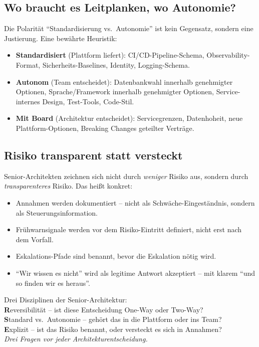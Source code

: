 \documentclass[11pt,a4paper,oneside]{article}
\newcommand{\caveatfontfallback}{\itshape}
\newcommand\caveatfont{\caveatfontfallback}%
\newcommand{\akzent}[1]{{\caveatfont\color{lpAmber}#1}}
\begin{document}
\subsection{Wo braucht es Leitplanken, wo Autonomie?}

Die Polarität ``Standardisierung vs.\ Autonomie'' ist kein Gegensatz, sondern eine Justierung. Eine bewährte Heuristik:

\begin{itemize}
  \item \textbf{Standardisiert} (Plattform liefert): CI/CD-Pipeline-Schema, Observability-Format, Sicherheits-Baselines, Identity, Logging-Schema.
  \item \textbf{Autonom} (Team entscheidet): Datenbankwahl innerhalb genehmigter Optionen, Sprache/Framework innerhalb genehmigter Optionen, Service-internes Design, Test-Tools, Code-Stil.
  \item \textbf{Mit Board} (Architektur entscheidet): Servicegrenzen, Datenhoheit, neue Plattform-Optionen, Breaking Changes geteilter Verträge.
\end{itemize}

\subsection{Risiko transparent statt versteckt}

Senior-Architekten zeichnen sich nicht durch \emph{weniger} Risiko aus, sondern durch \emph{transparenteres} Risiko. Das heißt konkret:

\begin{itemize}
  \item Annahmen werden dokumentiert -- nicht als Schwäche-Eingeständnis, sondern als Steuerungsinformation.
  \item Frühwarnsignale werden vor dem Risiko-Eintritt definiert, nicht erst nach dem Vorfall.
  \item Eskalations-Pfade sind benannt, bevor die Eskalation nötig wird.
  \item ``Wir wissen es nicht'' wird als legitime Antwort akzeptiert -- mit klarem ``und so finden wir es heraus''.
\end{itemize}

\begin{eselsbox}[Eselsbrücke: \akzent{R-S-E}]
Drei Disziplinen der Senior-Architektur:\\[2pt]
\textbf{R}eversibilität -- ist diese Entscheidung One-Way oder Two-Way?\\
\textbf{S}tandard vs.\ Autonomie -- gehört das in die Plattform oder ins Team?\\
\textbf{E}xplizit -- ist das Risiko benannt, oder versteckt es sich in Annahmen?\\[2pt]
\emph{Drei Fragen vor jeder Architekturentscheidung.}
\end{eselsbox}
\end{document}
